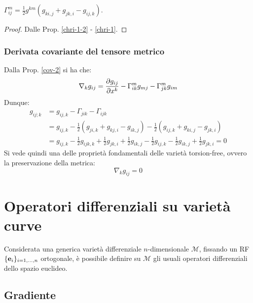 \begin{proposition}\label{levi-civita}
	$ \Gamma^m_{ij} = \frac{1}{2} g^{km} \left( g_{ki,j} + g_{jk,i} - g_{ij,k} \right) $.
\end{proposition}
\begin{proof}
	Dalle Prop. \ref{chri-1-2} - \ref{chri-1}.
\end{proof}

\subsubsection{Derivata covariante del tensore metrico}

Dalla Prop. \ref{cov-2} si ha che:
\begin{equation}
	\nabla_k g_{ij} = \frac{\partial g_{ij}}{\partial x^k} - \Gamma^m_{ik} g_{mj} - \Gamma^m_{jk} g_{im}
	\label{eq:4.15}
\end{equation}
Dunque:
\begin{equation*}
	\begin{split}
		g_{ij;k}
		&= g_{ij,k} - \Gamma_{jik} - \Gamma_{ijk}\\
		&= g_{ij,k} - \frac{1}{2} \left( g_{ji,k} + g_{kj,i} - g_{ik,j} \right) - \frac{1}{2} \left( g_{ij,k} + g_{ki,j} - g_{jk,i} \right)\\
		&= g_{ij,k} - \frac{1}{2} g_{ijk,k} + \frac{1}{2} g_{jk,i} + \frac{1}{2} g_{ik,j} - \frac{1}{2} g_{ij,k} - \frac{1}{2} g_{ik,j} + \frac{1}{2} g_{jk,i} = 0
	\end{split}
\end{equation*}
Si vede quindi una delle proprietà fondamentali delle varietà torsion-free, ovvero la preservazione della metrica:
\begin{equation}
	\nabla_k g_{ij} = 0
	\label{eq:4.16}
\end{equation}

\section{Operatori differenziali su varietà curve}

Considerata una generica varietà differenziale $ n $-dimensionale $ \mathcal{M} $, fissando un RF $ \{\mathbf{e}_i\}_{i = 1, \dots, n} $ ortogonale, è possibile definire su $ \mathcal{M} $ gli usuali operatori differenziali dello spazio euclideo.

\subsection{Gradiente}

